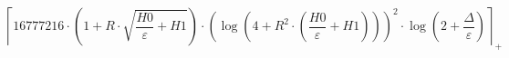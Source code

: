 \[\left\lceil 16777216 \cdot \left(1 + R \cdot \sqrt{\frac{H0}{\varepsilon} + H1}\right) \cdot \left(\log\left(4 + R^{2} \cdot \left(\frac{H0}{\varepsilon} + H1\right)\right)\right)^{2} \cdot \log\left(2 + \frac{\Delta}{\varepsilon}\right) \right\rceil_{+}\]
